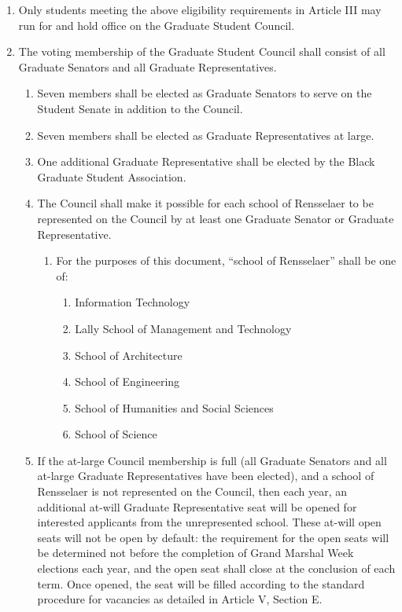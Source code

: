 \begin{enumerate}
\item Only students meeting the above eligibility requirements in Article III may run for and hold office on the Graduate Student Council.
\item The voting membership of the Graduate Student Council shall consist of all Graduate Senators and all Graduate Representatives.
  \begin{enumerate}
  \item Seven members shall be elected as Graduate Senators to serve on the Student Senate in addition to the Council.
  \item Seven members shall be elected as Graduate Representatives at large.
  \item One additional Graduate Representative shall be elected by the Black Graduate Student Association.
  \item The Council shall make it possible for each school of Rensselaer to be represented on the Council by at least one Graduate Senator or Graduate Representative.
    \begin{enumerate}
    \item For the purposes of this document, ``school of Rensselaer'' shall be one of:
      \begin{enumerate}
      \item Information Technology
      \item Lally School of Management and Technology
      \item School of Architecture
      \item School of Engineering
      \item School of Humanities and Social Sciences
      \item School of Science
      \end{enumerate}
    \end{enumerate}
  \item If the at-large Council membership is full (all Graduate Senators and all at-large Graduate Representatives have been elected), and a school of Rensselaer is not represented on the Council, then each year, an additional at-will Graduate Representative seat will be opened for interested applicants from the unrepresented school. These at-will open seats will not be open by default: the requirement for the open seats will be determined not before the completion of Grand Marshal Week elections each year, and the open seat shall close at the conclusion of each term. Once opened, the seat will be filled according to the standard procedure for vacancies as detailed in Article V, Section E.

\end{enumerate}
\end{enumerate}
